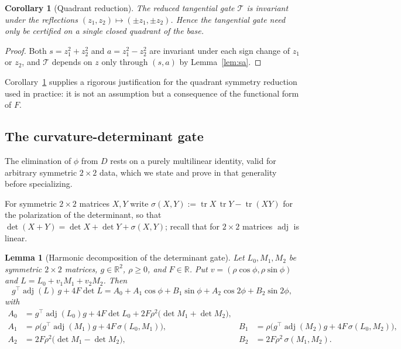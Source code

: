 \documentclass[11pt,reqno]{amsart}
\theoremstyle{plain}
\newtheorem{lemma}[theorem]{Lemma}
\newtheorem{corollary}[theorem]{Corollary}
\theoremstyle{definition}
\DeclareMathOperator{\tr}{tr}
\DeclareMathOperator{\adj}{adj}
\newcommand{\R}{\mathbb{R}}
\newcommand{\calT}{\mathcal{T}}
\begin{document}
\begin{corollary}[Quadrant reduction]\label{cor:quad}
The reduced tangential gate $\calT$ is invariant under the reflections $(z_1,z_2)\mapsto(\pm z_1,\pm z_2)$. Hence the tangential gate need only be certified on a single closed quadrant of the base.
\end{corollary}

\begin{proof}
Both $s=z_1^2+z_2^2$ and $a=z_1^2-z_2^2$ are invariant under each sign change of $z_1$ or $z_2$, and $\calT$ depends on $z$ only through $(s,a)$ by Lemma~\ref{lem:sa}.
\end{proof}

Corollary~\ref{cor:quad} supplies a rigorous justification for the quadrant symmetry reduction used in practice: it is not an assumption but a consequence of the functional form of $F$.

\subsection{The curvature-determinant gate}

The elimination of $\phi$ from $D$ rests on a purely multilinear identity, valid for arbitrary symmetric $2\times2$ data, which we state and prove in that generality before specializing.

For symmetric $2\times2$ matrices $X,Y$ write $\sigma(X,Y):=\tr X\,\tr Y-\tr(XY)$ for the polarization of the determinant, so that $\det(X+Y)=\det X+\det Y+\sigma(X,Y)$; recall that for $2\times2$ matrices $\adj$ is linear.

\begin{lemma}[Harmonic decomposition of the determinant gate]\label{lem:harm}
Let $L_0,M_1,M_2$ be symmetric $2\times 2$ matrices, $g\in\R^2$, $\rho\ge0$, and $F\in\R$. Put $v=(\rho\cos\phi,\rho\sin\phi)$ and $L=L_0+v_1M_1+v_2M_2$. Then
\begin{equation}\label{eq:harm}
g^\top\adj(L)\,g+4F\det L=A_0+A_1\cos\phi+B_1\sin\phi+A_2\cos2\phi+B_2\sin2\phi,
\end{equation}
with
\begin{align*}
A_0&=g^\top\adj(L_0)g+4F\det L_0+2F\rho^2\bigl(\det M_1+\det M_2\bigr),\\
A_1&=\rho\bigl(g^\top\adj(M_1)g+4F\,\sigma(L_0,M_1)\bigr),
&
B_1&=\rho\bigl(g^\top\adj(M_2)g+4F\,\sigma(L_0,M_2)\bigr),\\
A_2&=2F\rho^2\bigl(\det M_1-\det M_2\bigr),
&
B_2&=2F\rho^2\,\sigma(M_1,M_2).
\end{align*}
\end{lemma}
\end{document}
